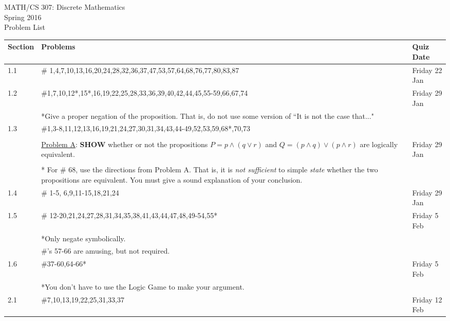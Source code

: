 \documentclass[11pt]{article}
\begin{document}
\begin{center}MATH/CS 307:  Discrete Mathematics \\ Spring 2016 \\ Problem List\end{center}

\hrulefill

\begin{tabular}{|p{1.6cm}|p{12cm}|p{3cm}|}
\hline
Section & Problems & Quiz Date\\
\hline \hline
1.1 & \# 1,4,7,10,13,16,20,24,28,32,36,37,47,53,57,64,68,76,77,80,83,87& Friday 22 Jan \\
\hline
1.2 & \#1,7,10,12*,15*,16,19,22,25,28,33,36,39,40,42,44,45,55-59,66,67,74 & Friday 29 Jan \\
&*Give a proper negation of the proposition. That is, do not use some version of ``It is not the case that..."&\\
\hline
1.3 & \#1,3-8,11,12,13,16,19,21,24,27,30,31,34,43,44-49,52,53,59,68*,70,73&\\
&&\\
& \underline{Problem A}: \textbf{SHOW} whether or not the propositions $P=p \wedge(q\vee r)$ and $Q=(p \wedge q) \vee (p \wedge r)$ are logically equivalent.&Friday 29 Jan\\
&&\\
& * For \# 68, use the directions from Problem A. That is, it is \emph{not sufficient} to simple \emph{state} whether the two propositions are equivalent. You must give a sound explanation of your conclusion.&\\
\hline
1.4 & \# 1-5, 6,9,11-15,18,21,24& Friday 29 Jan\\
\hline
1.5 & \# 12-20,21,24,27,28,31,34,35,38,41,43,44,47,48,49-54,55*&Friday 5 Feb\\
& *Only negate symbolically. &\\
& \#'s 57-66 are amusing, but not required. & \\
\hline
1.6 & \#37-60,64-66*&Friday 5 Feb\\
&*You don't have to use the Logic Game to make your argument.&\\
\hline
2.1 & \#7,10,13,19,22,25,31,33,37& Friday 12 Feb \\
\hline
\end{tabular}
\end{document}
